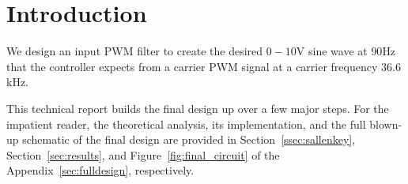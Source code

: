 \section{Introduction}
\label{sec:intro}

We design an input PWM filter to create the desired $0-10$\unit{\volt} sine wave
at $90$\unit{\hertz} that the controller expects from a carrier PWM signal at a
carrier frequency $36.6$\unit{\kilo\hertz}. 

This technical report builds the final design up over a few major steps. For the
impatient reader, the theoretical analysis, its implementation, and the full
blown-up schematic of the final design are provided in
Section~\ref{ssec:sallenkey}, Section~\ref{sec:results}, and
Figure~\ref{fig:final_circuit} of the Appendix~\ref{sec:fulldesign},
respectively.
